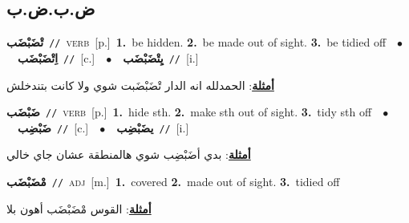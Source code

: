 \documentclass[10pt,a4paper,twoside]{article} %
\begin{document}
\begin{multicols}{2}
\vspace{-3mm}
\subsection*{\color{blue}\foreignlanguage{arabic}{ض.ب.ض.ب}\color{blue}{}} 

{\setlength\topsep{0pt}\textbf{\foreignlanguage{arabic}{تْضَبْضَب}}\ {\color{gray}\texttt{//}\color{black}}\ \textsc{verb}\ [p.]\ \textbf{1.}~be hidden.  \textbf{2.}~be made out of sight.  \textbf{3.}~be tidied off\ \ $\bullet$\ \ \setlength\topsep{0pt}\textbf{\foreignlanguage{arabic}{اِتْضَبْضَب}}\ {\color{gray}\texttt{//}\color{black}}\ [c.]\ \ $\bullet$\ \ \setlength\topsep{0pt}\textbf{\foreignlanguage{arabic}{يِتْضَبْضَب}}\ {\color{gray}\texttt{//}\color{black}}\ [i.]\  \begin{flushright}\color{gray}\foreignlanguage{arabic}{\textbf{\underline{\foreignlanguage{arabic}{أمثلة}}}: الحمدلله انه الدار تْضَبْضَبت شوي ولا كانت بتندخلش}\end{flushright}\color{black}} \vspace{2mm}

{\setlength\topsep{0pt}\textbf{\foreignlanguage{arabic}{ضَبْضَب}}\ {\color{gray}\texttt{//}\color{black}}\ \textsc{verb}\ [p.]\ \textbf{1.}~hide sth.  \textbf{2.}~make sth out of sight.  \textbf{3.}~tidy sth off\ \ $\bullet$\ \ \setlength\topsep{0pt}\textbf{\foreignlanguage{arabic}{ضَبْضِب}}\ {\color{gray}\texttt{//}\color{black}}\ [c.]\ \ $\bullet$\ \ \setlength\topsep{0pt}\textbf{\foreignlanguage{arabic}{يضَبْضِب}}\ {\color{gray}\texttt{//}\color{black}}\ [i.]\  \begin{flushright}\color{gray}\foreignlanguage{arabic}{\textbf{\underline{\foreignlanguage{arabic}{أمثلة}}}: بدي أضَبْضِب شوي هالمنطقة عشان جاي خالي}\end{flushright}\color{black}} \vspace{2mm}

{\setlength\topsep{0pt}\textbf{\foreignlanguage{arabic}{مْضَبْضَب}}\ {\color{gray}\texttt{//}\color{black}}\ \textsc{adj}\ [m.]\ \textbf{1.}~covered  \textbf{2.}~made out of sight.  \textbf{3.}~tidied off\  \begin{flushright}\color{gray}\foreignlanguage{arabic}{\textbf{\underline{\foreignlanguage{arabic}{أمثلة}}}: القوس مْضَبْضَب أهون بلا}\end{flushright}\color{black}} \vspace{2mm}


\end{multicols}
\end{document}
